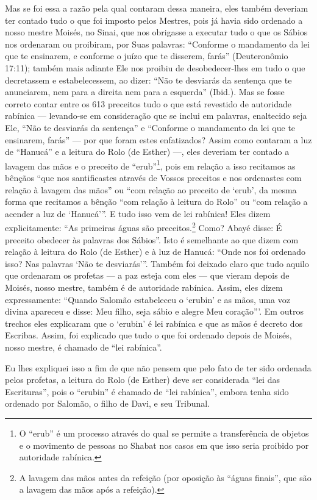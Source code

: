 Mas se foi essa a razão pela qual contaram dessa maneira, eles também
deveriam ter contado tudo o que foi imposto pelos Mestres, pois já havia
sido ordenado a nosso mestre Moisés, no Sinai, que nos obrigasse a
executar tudo o que os Sábios nos ordenaram ou proibiram, por Suas
palavras: ``Conforme o mandamento da lei que te ensinarem, e conforme o
juízo que te disserem, farás'' (Deuteronômio 17:11); também mais
adiante Ele nos proibiu de desobedecer-lhes em tudo o que decretassem e
estabelecessem, ao dizer: ``Não te desviarás da sentença que te
anunciarem, nem para a direita nem para a esquerda'' (Ibid.). Mas se
fosse correto contar entre os 613 preceitos tudo o que está revestido de
autoridade rabínica --- levando-se em consideração que se inclui em
palavras, enaltecido seja Ele, ``Não te desviarás da sentença'' e
``Conforme o mandamento da lei que te ensinarem, farás'' --- por que
foram estes enfatizados? Assim como contaram a luz de ``Hanucá'' e a
leitura do Rolo (de Esther) ---, eles deveriam ter contado a lavagem das
mãos e o preceito de ``erub''\footnote{O ``erub'' é um processo através do qual se permite a transferência de objetos e o movimento de pessoas no Shabat nos casos em que isso seria proibido por autoridade rabínica.}, pois em relação a
isso recitamos as bênçãos ``que nos santificastes
através de Vossos preceitos e nos ordenastes com relação à lavagem das
mãos'' ou ``com relação ao preceito de `erub', da mesma forma que
recitamos a bênção ``com relação à leitura do Rolo'' ou ``com relação a
acender a luz de `Hanucá'''. E tudo isso vem de lei rabínica! Eles
dizem explicitamente: ``As primeiras águas são
preceitos.\footnote{A lavagem das mãos antes da refeição (por oposição às ``águas
  finais'', que são a lavagem das mãos após a refeição).} Como? Abayé disse: É preceito obedecer às
palavras dos Sábios''. Isto é semelhante ao que dizem com relação à
leitura do Rolo (de Esther) e à luz de Hanucá: ``Onde nos foi ordenado
isso? Nas palavras `Não te desviarás'''. Também foi deixado claro que
tudo aquilo que ordenaram os profetas --- a paz esteja com eles --- que
vieram depois de Moisés, nosso mestre, também é de autoridade rabínica.
Assim, eles dizem expressamente: ``Quando Salomão estabeleceu o `erubin'
e as mãos, uma voz divina apareceu e disse: Meu
filho, seja sábio e alegre Meu coração'''. Em outros trechos eles
explicaram que o `erubin' é lei rabínica e que as
mãos é decreto dos Escribas. Assim, foi explicado
que tudo o que foi ordenado depois de Moisés, nosso mestre, é chamado de
``lei rabínica''.

Eu lhes expliquei isso a fim de que não pensem que pelo fato de ter sido
ordenada pelos profetas, a leitura do Rolo (de Esther) deve ser
considerada ``lei das Escrituras'', pois o ``erubin'' é chamado de
``lei rabínica'', embora tenha sido ordenado por Salomão, o filho de
Davi, e seu Tribunal.

